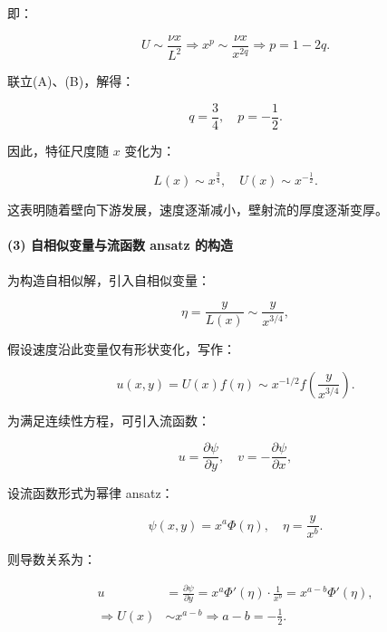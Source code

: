 即：

\begin{equation}
U \sim \frac{\nu x}{L^2} \Rightarrow x^p \sim \frac{\nu x}{x^{2q}} \Rightarrow p = 1 - 2q. \tag{B}
\end{equation}

联立(A)、(B)，解得：

\begin{equation}
q = \frac{3}{4}, \quad p = -\frac{1}{2}.
\end{equation}

因此，特征尺度随 \( x \) 变化为：

\begin{equation}
L(x) \sim x^{\frac{3}{4}}, \quad U(x) \sim x^{-\frac{1}{2}}.
\end{equation}

这表明随着壁向下游发展，速度逐渐减小，壁射流的厚度逐渐变厚。

\paragraph{(3) 自相似变量与流函数 ansatz 的构造}

为构造自相似解，引入自相似变量：

\begin{equation}
\eta = \frac{y}{L(x)} \sim \frac{y}{x^{3/4}},
\end{equation}

假设速度沿此变量仅有形状变化，写作：

\begin{equation}
u(x, y) = U(x) f(\eta) \sim x^{-1/2} f\left( \frac{y}{x^{3/4}} \right).
\end{equation}

为满足连续性方程，可引入流函数：

\begin{equation}
u = \frac{\partial \psi}{\partial y}, \quad v = -\frac{\partial \psi}{\partial x},
\end{equation}

设流函数形式为幂律 ansatz：

\begin{equation}
\psi(x, y) = x^a \Phi(\eta), \quad \eta = \frac{y}{x^b}.
\end{equation}

则导数关系为：

\begin{align}
u &= \frac{\partial \psi}{\partial y} = x^a \Phi'(\eta) \cdot \frac{1}{x^b} = x^{a - b} \Phi'(\eta), \\
\Rightarrow U(x) &\sim x^{a - b} \Rightarrow a - b = -\frac{1}{2}. \tag{C}
\end{align}

